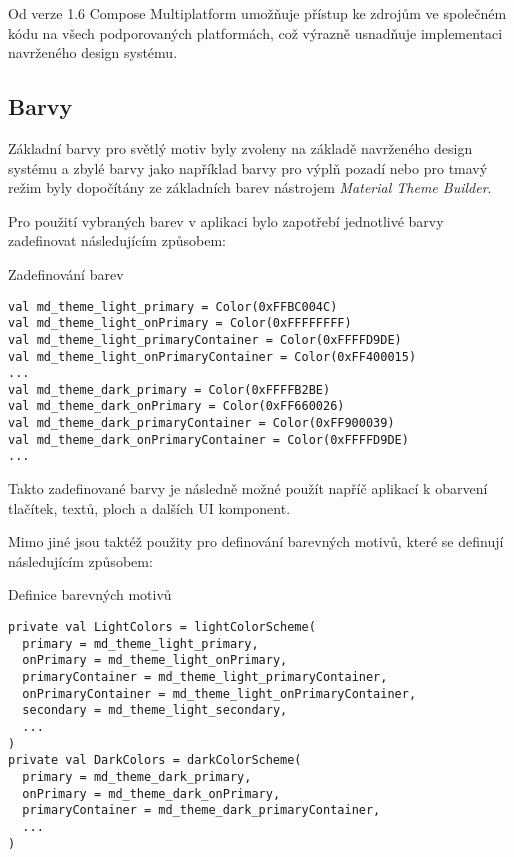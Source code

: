 Od verze 1.6 Compose Multiplatform umožňuje přístup ke zdrojům ve společném kódu na všech podporovaných platformách, což výrazně usnadňuje 
implementaci navrženého design systému. 


\subsection*{Barvy} \label{colorSection}
Základní barvy pro světlý motiv byly zvoleny na základě navrženého design systému
a zbylé barvy jako například barvy pro výplň pozadí nebo pro tmavý režim byly dopočítány ze základních barev nástrojem \textit{Material Theme Builder}.

Pro použití vybraných barev v aplikaci bylo zapotřebí jednotlivé barvy zadefinovat následujícím způsobem:

\begin{listing}[H]
\caption{Zadefinování barev}\label{lst:Colors}
\begin{verbatim}
val md_theme_light_primary = Color(0xFFBC004C)
val md_theme_light_onPrimary = Color(0xFFFFFFFF)
val md_theme_light_primaryContainer = Color(0xFFFFD9DE)
val md_theme_light_onPrimaryContainer = Color(0xFF400015)
...
val md_theme_dark_primary = Color(0xFFFFB2BE)
val md_theme_dark_onPrimary = Color(0xFF660026)
val md_theme_dark_primaryContainer = Color(0xFF900039)
val md_theme_dark_onPrimaryContainer = Color(0xFFFFD9DE)
...
\end{verbatim}
\end{listing}

Takto zadefinované barvy je následně možné použít napříč aplikací k obarvení tlačítek, textů, ploch a dalších UI komponent.

Mimo jiné jsou taktéž použity pro definování barevných motivů, které se definují následujícím způsobem:
\begin{listing}[H]
\caption{Definice barevných motivů}\label{lst:ThemeDef}
\begin{verbatim}
private val LightColors = lightColorScheme(
  primary = md_theme_light_primary,
  onPrimary = md_theme_light_onPrimary,
  primaryContainer = md_theme_light_primaryContainer,
  onPrimaryContainer = md_theme_light_onPrimaryContainer,
  secondary = md_theme_light_secondary,
  ...
)
private val DarkColors = darkColorScheme(
  primary = md_theme_dark_primary,
  onPrimary = md_theme_dark_onPrimary,
  primaryContainer = md_theme_dark_primaryContainer,
  ...
)
\end{verbatim}
\end{listing}

